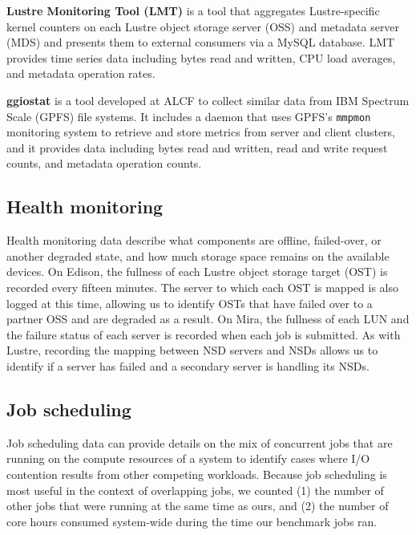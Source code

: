 \label{sec:methods/lmt}
\textbf{Lustre Monitoring Tool (LMT)} is a tool that aggregates Lustre-specific kernel counters on each Lustre object storage server (OSS) and metadata server (MDS) and presents them to external consumers via a MySQL database.
LMT provides time series data including bytes read and written, CPU load averages, and metadata operation rates.

\label{sec:methods/ggiostat}
\textbf{ggiostat} is a tool developed at ALCF to collect similar data from IBM Spectrum Scale (GPFS) file systems.
It includes a daemon that uses GPFS's \texttt{mmpmon} monitoring system to retrieve and store metrics from server and client clusters, and it provides data including bytes read and written, read and write request counts, and metadata operation counts.

\subsection{Health monitoring} \label{sec:methods/health}

Health monitoring data describe what components are offline, failed-over, or another degraded state, and how much storage space remains on the available devices.
On Edison, the fullness of each Lustre object storage target (OST) is recorded every fifteen minutes.  The server to which each OST is mapped is also logged at this time, allowing us to identify OSTs that have failed over to a partner OSS and are degraded as a result.
On Mira, the fullness of each LUN and the failure status of each server is recorded when each job is submitted.
As with Lustre, recording the mapping between NSD servers and NSDs allows us to identify if a server has failed and a secondary server is handling its NSDs.

\subsection{Job scheduling} \label{sec:methods/scheduling}

Job scheduling data can provide details on the mix of concurrent jobs that are running on the compute resources of a system to identify cases where I/O contention results from other competing workloads.
Because job scheduling is most useful in the context of overlapping jobs, we counted (1) the number of other jobs that were running at the same time as ours, and (2) the number of core hours consumed system-wide during the time our benchmark jobs ran.


